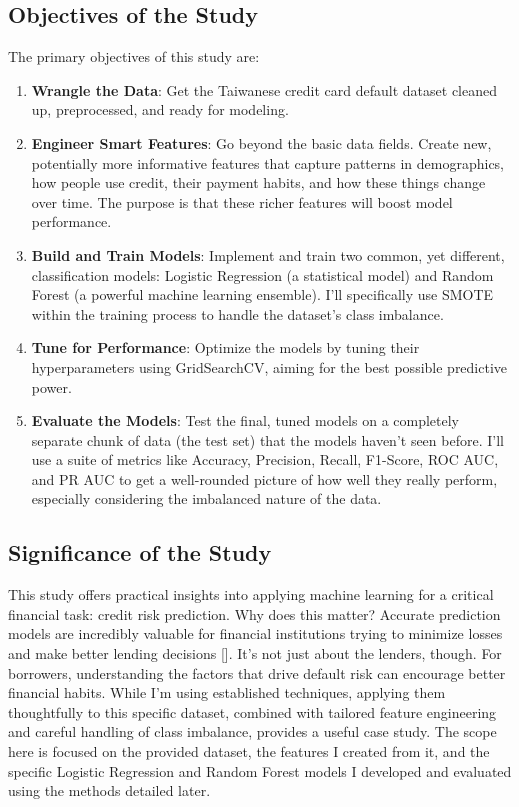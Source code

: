 \documentclass[a4paper,12pt]{article}
\begin{document}
\subsection{Objectives of the Study}

The primary objectives of this study are:
\begin{enumerate}
    \item \textbf{Wrangle the Data}: Get the Taiwanese credit card default dataset cleaned up, preprocessed, and ready for modeling.
    \item \textbf{Engineer Smart Features}: Go beyond the basic data fields. Create new, potentially more informative features that capture patterns in demographics, how people use credit, their payment habits, and how these things change over time. The purpose is that these richer features will boost model performance.
    \item \textbf{Build and Train Models}: Implement and train two common, yet different, classification models: Logistic Regression (a statistical model) and Random Forest (a powerful machine learning ensemble). I'll specifically use SMOTE within the training process to handle the dataset's class imbalance.
    \item \textbf{Tune for Performance}: Optimize the models by tuning their hyperparameters using GridSearchCV, aiming for the best possible predictive power.
    \item \textbf{Evaluate the Models}: Test the final, tuned models on a completely separate chunk of data (the test set) that the models haven't seen before. I'll use a suite of metrics like Accuracy, Precision, Recall, F1-Score, ROC AUC, and PR AUC to get a well-rounded picture of how well they really perform, especially considering the imbalanced nature of the data.
\end{enumerate}

\subsection{Significance of the Study}

This study offers practical insights into applying machine learning for a critical financial task: credit risk prediction. Why does this matter? Accurate prediction models are incredibly valuable for financial institutions trying to minimize losses and make better lending decisions [\cite{henry2021survey}]. It's not just about the lenders, though. For borrowers, understanding the factors that drive default risk can encourage better financial habits. While I'm using established techniques, applying them thoughtfully to this specific dataset, combined with tailored feature engineering and careful handling of class imbalance, provides a useful case study. The scope here is focused on the provided dataset, the features I created from it, and the specific Logistic Regression and Random Forest models I developed and evaluated using the methods detailed later.
\end{document}
